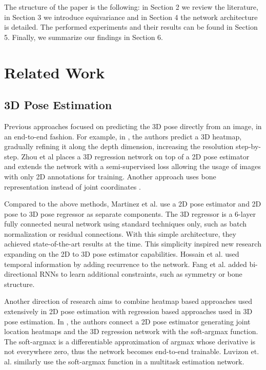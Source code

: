 \documentclass[preprint]{elsarticle}
\begin{document}
The structure of the paper is the following: in Section 2 we review the literature, in Section 3 we introduce equivariance and in Section 4 the network architecture is detailed. The performed experiments  and their results can be found in Section 5. Finally, we summarize our findings in Section 6.


\section{Related Work}
\subsection{3D Pose Estimation} 

Previous approaches focused on predicting the 3D pose directly from an image, in an end-to-end fashion. For example, in \cite{gorog}, the authors predict a 3D heatmap, gradually refining it along the depth dimension, increasing the resolution step-by-step. Zhou et al \cite{zhou2017} places a 3D regression network on top of a 2D pose estimator and extends the network with a semi-supervised loss allowing the usage of images with only 2D annotations for training. Another approach uses bone representation instead of joint coordinates \cite{Sun2017compositional}.

Compared to the above methods, Martinez et al. \cite{3dbaseline} use a 2D pose estimator and 2D pose to 3D pose regressor as separate components. The 3D regressor is a 6-layer fully connected neural network using standard techniques only, such as batch normalization or residual connections. With this simple architecture, they achieved state-of-the-art results at the time. This simplicity inspired new research expanding on the 2D to 3D pose estimator capabilities. Hossain et al. \cite{Hossain2017temporal} used temporal information by adding recurrence to the network. Fang et al. \cite{fang2018posegrammar} added bi-directional RNNs to learn additional constraints, such as symmetry or bone structure. 

Another direction of research aims to combine heatmap based approaches used extensively in 2D pose estimation \cite{openpose,stacked_hourglass} with regression based approaches used in 3D pose estimation. In \cite{integralPose}, the authors connect a 2D pose estimator generating joint location heatmaps and the 3D regression network with the soft-argmax function. The soft-argmax is a differentiable approximation of argmax whose derivative is not everywhere zero, thus the network becomes end-to-end trainable. Luvizon et. al. \cite{Luvizon2018softargmax} similarly use the soft-argmax function in a multitask estimation network.
\end{document}
